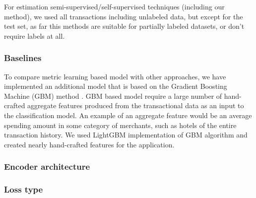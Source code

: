 \documentclass[sigconf]{acmart}
\begin{document}
For estimation semi-supervised/self-supervised techniques (including our method), we used all transactions including unlabeled data, but except for the test set, as far this methods are suitable for partially labeled datasets, or don't require labels at all.

\subsubsection{Baselines}

To compare metric learning based model with other approaches, we have implemented an
additional model that is based on the Gradient Boosting Machine
(GBM) method \cite{friedman2001}.
GBM based model require a large number of hand-crafted aggregate features produced from the transactional data as an input to the classification model. An example
of an aggregate feature would be an average spending amount in
some category of merchants, such as hotels of the entire transaction
history.
We used LightGBM\cite{NIPS2017_6907} implementation of GBM algorithm and
created nearly  hand-crafted features for the application.

\subsubsection{Encoder architecture}

\begin{table}[ht]
\caption{Comparison of encoder types}
\begin{tabular}{ | m{10em} |  m{7em} | m7em} | }
\hline
\textbf{Econder type} & \textbf{Age; Accuracy $\pm 95\%$}& \textbf{Gender; AUROC $\pm 95\%$} \\
\hline
\textbf{LSTM} & $0.603 \pm 0.006$ & $0.856 \pm 0.004$ \\
\textbf{GRU} & \pmb{$0.624 \pm 0.005$} & \pmb{$0.868 \pm 0.005$}  \\
\textbf{Transformer} & $0.613 \pm 0.004$ & $0.849 \pm 0.001$  \\
\hline
\end{tabular}
\label{tab-enc-type}
\end{table}

\subsubsection{Loss type}
\end{document}
